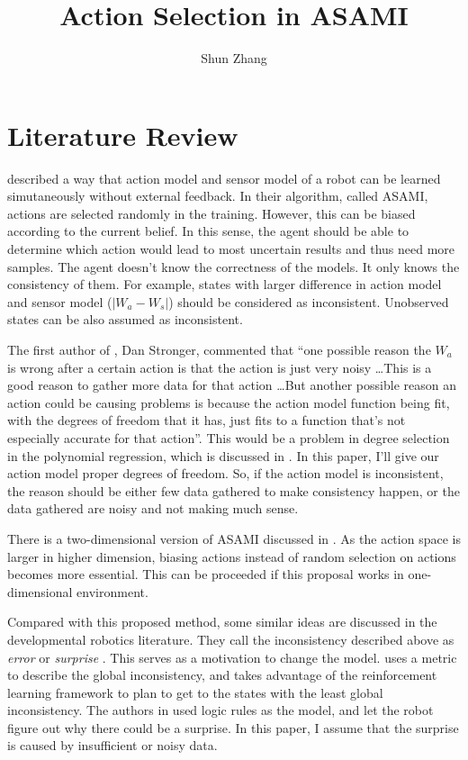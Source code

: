 \documentclass[10pt]{article}
\title{Action Selection in ASAMI}
\author{Shun Zhang}
\date{}
\begin{document}
\maketitle


\sloppy
\section{Literature Review}

\cite{CSJ06} described a way that action model and sensor model of a
robot can be learned simutaneously without external feedback.  In
their algorithm, called ASAMI, actions are selected randomly in the
training. However, this can be biased according to the current belief.
In this sense, the agent should be able to determine which action
would lead to most uncertain results and thus need more samples.  The
agent doesn't know the correctness of the models. It only knows the
consistency of them. For example, states with larger difference in
action model and sensor model ($|W_a - W_s|$) should be considered as
inconsistent. Unobserved states can be also assumed as inconsistent.

The first author of \cite{CSJ06}, Dan Stronger, commented that ``one
possible reason the $W_a$ is wrong after a certain action is that the
action is just very noisy \ldots This is a good reason to gather more
data for that action \ldots  But another possible reason  an action
could be causing problems is because the action model function being
fit, with the degrees of freedom that it has, just fits to a function
that's not especially accurate for that action''. This would be a
problem in degree selection in the polynomial regression, which is
discussed in \cite{IJAIT08-stronger}. In this paper, I'll give our
action model proper degrees of freedom. So, if the action model is
inconsistent, the reason should be either few data gathered to make
consistency happen, or the data gathered are noisy and not making much
sense.

There is a two-dimensional version of ASAMI discussed in
\cite{ICRA08-stronger}.  As the action space is larger in higher
dimension, biasing actions instead of random selection on actions
becomes more essential. This can be proceeded if this proposal works
in one-dimensional environment.

Compared with this proposed method, some similar ideas are discussed
in the developmental robotics literature. They call the inconsistency
described above as \textit{error} \cite{oudeyer2006discovering} or
\textit{surprise} \cite{ranasinghe2008surprise,
schmidhuber2006developmental}. This serves as a motivation to change
the model. \cite{oudeyer2006discovering} uses a metric to describe the
global inconsistency, and takes advantage of the reinforcement
learning framework to plan to get to the states with the least global
inconsistency. The authors in \cite{ranasinghe2008surprise} used logic
rules as the model, and let the robot figure out why there could be a
surprise. In this paper, I assume that the surprise is caused by
insufficient or noisy data.
\end{document}

